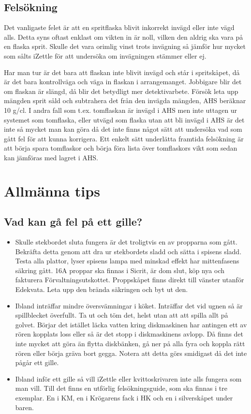 \documentclass[10pt]{article}
\begin{document}
\subsection{Felsökning}
Det vanligaste felet är att en spritflaska blivit inkorrekt invägd eller inte vägd alls. Detta syns oftast enklast om vikten in är noll, vilken den aldrig ska vara på en flaska sprit. Skulle det vara orimlig vinst trots invägning så jämför hur mycket som sålts iZettle för att undersöka om invägningen stämmer eller ej.

Har man tur är det bara att flaskan inte blivit invägd och står i spritskåpet, då är det bara kontrollväga och väga in flaskan i arrangemanget. Jobbigare blir det om flaskan är slängd, då blir det betydligt mer detektivarbete. Försök leta upp mängden sprit såld och subtrahera det från den invägda mängden, AHS beräknar 10 g/cl. I andra fall som t.ex. tomflaskan är invägd i AHS men inte uttagen ur systemet som tomflaska, eller utvägd som flaska utan att bli invägd i AHS är det inte så mycket man kan göra då det inte finns något sätt att undersöka vad som gått fel för att kunna korrigera. Ett enkelt sätt underlätta framtida felsökning är att börja spara tomflaskor och börja föra lista över tomflaskors vikt som sedan kan jämföras med lagret i AHS.


\section{Allmänna tips}
	\subsection{Vad kan gå fel på ett gille?}
\begin{itemize}
	\item Skulle stekbordet sluta fungera är det troligtvis en av propparna som gått. Bekräfta detta genom att dra ur stekbordets sladd och sätta i spisens sladd. Testa alla plattor, lyser spisens lampa med minskad effekt har mittenfasens säkring gått. 16A proppar ska finnas i Sicrit, är dom slut, köp nya och fakturera Förvaltningsutskottet. Proppskåpet finns direkt till vänster utanför Edekvata. Leta upp den brända säkringen och byt ut den.
    \item Ibland inträffar mindre översvämningar i köket. Inträffar det vid ugnen så är spillblecket överfullt. Ta ut och töm det, helst utan att att spilla allt på golvet. Börjar det istället läcka vatten kring diskmaskinen har antingen ett av rören kopplats loss eller så är det stopp i diskmaskinens avlopp. Då finns det inte mycket att göra än flytta diskbänken, gå ner på alla fyra och koppla rätt rören eller börja gräva bort gegga. Notera att detta görs smidigast då det inte pågår ett gille.
    \item Ibland inför ett gille så vill iZettle eller kvittoskrivaren inte alls fungera som man vill. Till det finns en utförlig felsökningsguide, som ska finnas i tre exemplar. En i KM, en i Krögarens fack i HK och en i silverskåpet under baren.
\end{itemize}
\end{document}
